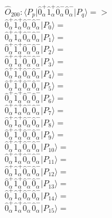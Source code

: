 \documentclass[14pt]{article}
\begin{document}
    $\hat{O}_{200}:  \langle{P_p}\vert \hat{0}_{\alpha}^{+}\hat{1}_{\alpha}^{+}\hat{0}_{\alpha}^{-}\hat{0}_{\alpha}^{-} \vert{P_q}\rangle => $ \\ 
    $ \hat{0}_{\alpha}^{+}\hat{1}_{\alpha}^{+}\hat{0}_{\alpha}^{-}\hat{0}_{\alpha}^{-} \vert{P_{0}}\rangle =  $ \\ 
    $ \hat{0}_{\alpha}^{+}\hat{1}_{\alpha}^{+}\hat{0}_{\alpha}^{-}\hat{0}_{\alpha}^{-} \vert{P_{1}}\rangle =  $ \\ 
    $ \hat{0}_{\alpha}^{+}\hat{1}_{\alpha}^{+}\hat{0}_{\alpha}^{-}\hat{0}_{\alpha}^{-} \vert{P_{2}}\rangle =  $ \\ 
    $ \hat{0}_{\alpha}^{+}\hat{1}_{\alpha}^{+}\hat{0}_{\alpha}^{-}\hat{0}_{\alpha}^{-} \vert{P_{3}}\rangle =  $ \\ 
    $ \hat{0}_{\alpha}^{+}\hat{1}_{\alpha}^{+}\hat{0}_{\alpha}^{-}\hat{0}_{\alpha}^{-} \vert{P_{4}}\rangle =  $ \\ 
    $ \hat{0}_{\alpha}^{+}\hat{1}_{\alpha}^{+}\hat{0}_{\alpha}^{-}\hat{0}_{\alpha}^{-} \vert{P_{5}}\rangle =  $ \\ 
    $ \hat{0}_{\alpha}^{+}\hat{1}_{\alpha}^{+}\hat{0}_{\alpha}^{-}\hat{0}_{\alpha}^{-} \vert{P_{6}}\rangle =  $ \\ 
    $ \hat{0}_{\alpha}^{+}\hat{1}_{\alpha}^{+}\hat{0}_{\alpha}^{-}\hat{0}_{\alpha}^{-} \vert{P_{7}}\rangle =  $ \\ 
    $ \hat{0}_{\alpha}^{+}\hat{1}_{\alpha}^{+}\hat{0}_{\alpha}^{-}\hat{0}_{\alpha}^{-} \vert{P_{8}}\rangle =  $ \\ 
    $ \hat{0}_{\alpha}^{+}\hat{1}_{\alpha}^{+}\hat{0}_{\alpha}^{-}\hat{0}_{\alpha}^{-} \vert{P_{9}}\rangle =  $ \\ 
    $ \hat{0}_{\alpha}^{+}\hat{1}_{\alpha}^{+}\hat{0}_{\alpha}^{-}\hat{0}_{\alpha}^{-} \vert{P_{10}}\rangle =  $ \\ 
    $ \hat{0}_{\alpha}^{+}\hat{1}_{\alpha}^{+}\hat{0}_{\alpha}^{-}\hat{0}_{\alpha}^{-} \vert{P_{11}}\rangle =  $ \\ 
    $ \hat{0}_{\alpha}^{+}\hat{1}_{\alpha}^{+}\hat{0}_{\alpha}^{-}\hat{0}_{\alpha}^{-} \vert{P_{12}}\rangle =  $ \\ 
    $ \hat{0}_{\alpha}^{+}\hat{1}_{\alpha}^{+}\hat{0}_{\alpha}^{-}\hat{0}_{\alpha}^{-} \vert{P_{13}}\rangle =  $ \\ 
    $ \hat{0}_{\alpha}^{+}\hat{1}_{\alpha}^{+}\hat{0}_{\alpha}^{-}\hat{0}_{\alpha}^{-} \vert{P_{14}}\rangle =  $ \\ 
    $ \hat{0}_{\alpha}^{+}\hat{1}_{\alpha}^{+}\hat{0}_{\alpha}^{-}\hat{0}_{\alpha}^{-} \vert{P_{15}}\rangle =  $ \\ 
    
\end{document}
